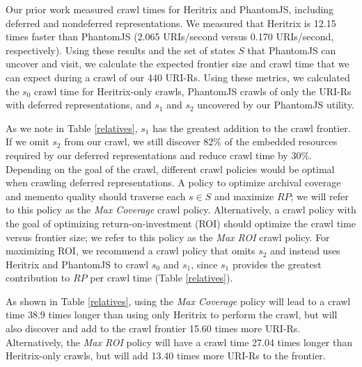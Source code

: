\documentclass{sig-alternate}
\begin{document}
Our prior work \cite{crawlingDeferred} measured crawl times for Heritrix and PhantomJS, including deferred and nondeferred representations. %
We measured that Heritrix is 12.15 times faster than PhantomJS (2.065 URIs/second versus 0.170 URIs/second, respectively). 
Using these results and the set of states $S$ that PhantomJS can uncover and visit, we calculate the expected frontier size and crawl time that we can expect during a crawl of our 440 URI-Rs. 
Using these metrics, we calculated the $s_0$ crawl time for Heritrix-only crawls, PhantomJS crawls of only the URI-Rs with deferred representations, and $s_1$ and $s_2$ uncovered by our PhantomJS utility. %


As we note in Table \ref{relatives}, $s_1$ has the greatest addition to the crawl frontier. If we omit $s_2$ from our crawl, we still discover 82\% of the embedded resources required by our deferred representations and reduce crawl time by 30\%. Depending on the goal of the crawl, different crawl policies would be optimal when crawling deferred representations. A policy to optimize archival coverage and memento quality should traverse each $s \in S$ and maximize $RP$; we will refer to this policy as the \emph{Max Coverage} crawl policy. Alternatively, a crawl policy with the goal of optimizing return-on-investment (ROI) should optimize the crawl time versus frontier size; we refer to this policy as the \emph{Max ROI} crawl policy. For maximizing ROI, we recommend a crawl policy that omits $s_2$ and instead uses Heritrix and PhantomJS to crawl $s_0$ and $s_1$, since $s_1$ provides the greatest contribution to $RP$ per crawl time (Table \ref{relatives}). 


As shown in Table \ref{relatives}, using the \emph{Max Coverage} policy will lead to a crawl time 38.9 times longer than using only Heritrix to perform the crawl, but will also discover and add to the crawl frontier 15.60 times more URI-Rs. Alternatively, the \emph{Max ROI} policy will have a crawl time 27.04 times longer than Heritrix-only crawls, but will add 13.40 times more URI-Rs to the frontier.
\end{document}

